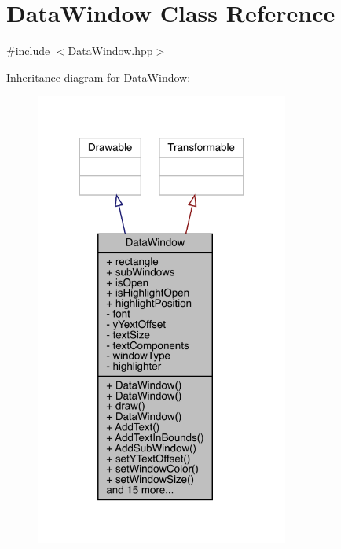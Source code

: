 \hypertarget{class_data_window}{}\section{Data\+Window Class Reference}
\label{class_data_window}


{\ttfamily \#include $<$Data\+Window.\+hpp$>$}



Inheritance diagram for Data\+Window\+:
\nopagebreak
\begin{figure}[H]
\begin{center}
\leavevmode
\includegraphics[width=236pt]{class_data_window__inherit__graph}
\end{center}
\end{figure}


